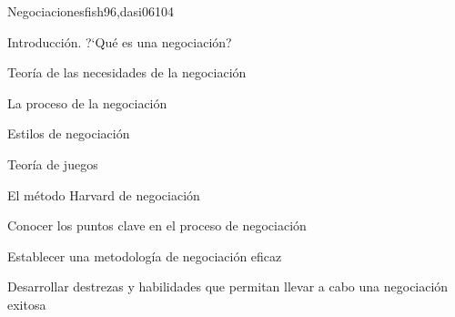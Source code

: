 \begin{syllabus}
\begin{unit}{Negociaciones}{fish96,dasi06}{10}{4}
\begin{topics}
      \item Introducción. ?`Qué es una negociación?
      \item Teoría de las necesidades de la negociación
      \item La proceso de la negociación
      \item Estilos de negociación
      \item Teoría de juegos
      \item El método Harvard de negociación
   \end{topics}
   \begin{learningoutcomes}
      \item Conocer los puntos clave en el proceso de negociación
      \item Establecer una metodología de negociación eficaz
      \item Desarrollar destrezas y habilidades que permitan llevar a cabo una negociación exitosa
   \end{learningoutcomes}
\end{unit}



\begin{coursebibliography}
\end{coursebibliography}

\end{syllabus}

%
